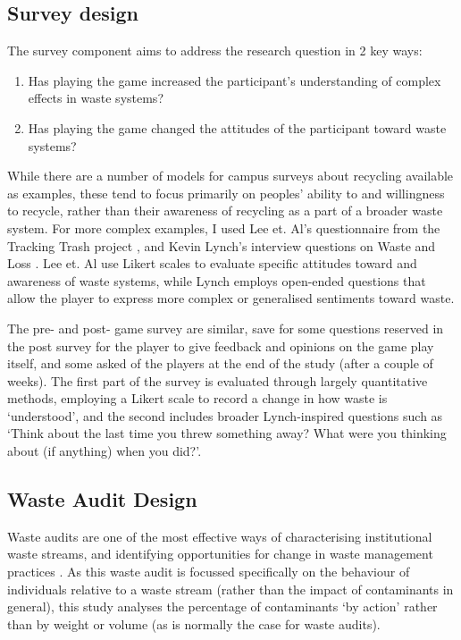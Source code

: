 \documentclass[nofonts,nols,justified,nobib]{tufte-book}
\begin{document}
\subsection*{Survey design}

The survey component aims to address the research question in 2 key ways:

\begin{enumerate}
\item Has playing the game increased the participant's understanding of complex effects in waste systems?
\item Has playing the game changed the attitudes of the participant toward waste systems?
\end{enumerate}

While there are a number of models for campus surveys about recycling available as examples, these tend to focus primarily on peoples' ability to and willingness to recycle, rather than their awareness of recycling as a part of a broader waste system. For more complex examples, I used Lee et. Al's questionnaire from the Tracking Trash project \cite{lee_learning_2014}, and Kevin Lynch's interview questions on Waste and Loss \cite{lynch_wasting_1990}. Lee et. Al use Likert scales to evaluate specific attitudes toward and awareness of waste systems, while Lynch employs open-ended questions that allow the player to express more complex or generalised sentiments toward waste.


The pre- and post- game survey are similar, save for some questions reserved in the post survey for the player to give feedback and opinions on the game play itself, and some asked of the players at the end of the study (after a couple of weeks). The first part of the survey is evaluated through largely quantitative methods, employing a Likert scale to record a change in how waste is `understood', and the second includes broader Lynch-inspired questions such as `Think about the last time you threw something away? What were you thinking about (if anything) when you did?'. 


\subsection*{Waste Audit Design}
Waste audits are one of the most effective ways of characterising institutional waste streams, and identifying opportunities for change in waste management practices \cite{smyth_reducing_2010}. As this waste audit is focussed specifically on the behaviour of individuals relative to a waste stream (rather than the impact of contaminants in general), this study analyses the percentage of contaminants `by action' rather than by weight or volume (as is normally the case for waste audits).
\end{document}
